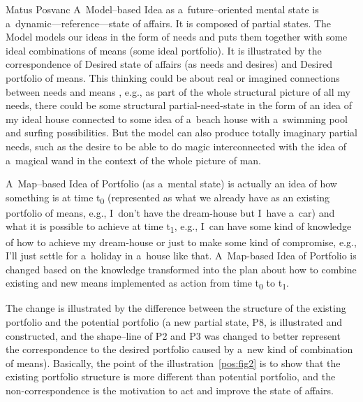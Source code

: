 \begin{artengenv}{Matus Posvanc}
A~Model–based Idea as a~future–oriented mental state is a~dynamic---reference---state of affairs. It is composed of partial states. The Model models our ideas in the form of needs and puts them together with some ideal combinations of means (some ideal portfolio). It is illustrated by the correspondence of Desired state of affairs (as needs and desires) and Desired portfolio of means. This thinking could be about real or imagined connections between needs and means 
\parencite[][]{Menger2007Principles}, %
 e.g., as part of the whole structural picture of all my needs, there could be some structural partial-need-state in the form of an idea of my ideal house connected to some idea of a~beach house with a~swimming pool and surfing possibilities. But the model can also produce totally imaginary partial needs, such as the desire to be able to do magic interconnected with the idea of a~magical wand in the context of the whole picture of man.



A~Map–based Idea of Portfolio (as a~mental state) is actually an idea of how something is at time t\textsubscript{0} (represented as what we already have as an existing portfolio of means, e.g., I~don't have the dream-house but I~have a~car) and what it is possible to achieve at time t\textsubscript{1}, e.g., I~can have some kind of knowledge of how to achieve my dream-house or just to make some kind of compromise, e.g., I'll just settle for a~holiday in a~house like that. A~Map-based Idea of Portfolio is changed based on the knowledge transformed into the plan about how to combine existing and new means implemented as action from time t\textsubscript{0} to t\textsubscript{1}.



The change is illustrated by the difference between the structure of the existing portfolio and the potential portfolio (a new partial state, P8, is illustrated and constructed, and the shape–line of P2 and P3 was changed to better represent the correspondence to the desired portfolio caused by a~new kind of combination of means). Basically, the point of the illustration~\ref{pos:fig2} is to show that the existing portfolio structure is more different than potential portfolio, and the non-correspondence is the motivation to act and improve the state of affairs.




\end{artengenv}

